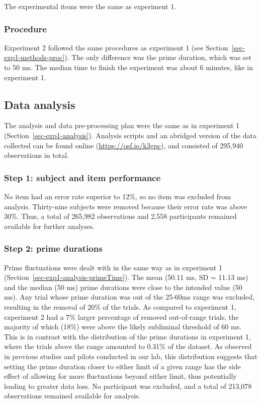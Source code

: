 \documentclass[
]{interact}
\begin{document}
The experimental items were the same as experiment 1.

\subsubsection{Procedure}\label{sec-exp2-methods-proc}

Experiment 2 followed the same procedures as experiment 1 (see
Section~\ref{sec-exp1-methods-proc}). The only difference was the prime
duration, which was set to 50 ms. The median time to finish the
experiment was about 6 minutes, like in experiment 1.

\subsection{Data analysis}\label{sec-exp2-analysis}

The analysis and data pre-processing plan were the same as in experiment
1 (Section~\ref{sec-exp1-analysis}). Analysis scripts and an abridged
version of the data collected can be found online
(\url{https://osf.io/k3gpc}), and consisted of 295,940 observations in
total.

\subsubsection{Step 1: subject and item
performance}\label{sec-exp2-analysis-performance}

No item had an error rate superior to 12\%, so no item was excluded from
analysis. Thirty-nine subjects were removed because their error rate was
above 30\%. Thus, a total of 265,982 observations and 2,558 participants
remained available for further analyses.

\subsubsection{Step 2: prime
durations}\label{sec-exp2-analysis-primeTime}

Prime fluctuations were dealt with in the same way as in experiment 1
(Section~\ref{sec-exp1-analysis-primeTime}). The mean (50.11 ms, SD =
11.13 ms) and the median (50 ms) prime durations were close to the
intended value (50 ms). Any trial whose prime duration was out of the
25-60ms range was excluded, resulting in the removal of 20\% of the
trials. As compared to experiment 1, experiment 2 had a 7\% larger
percentage of removed out-of-range trials, the majority of which (18\%)
were above the likely subliminal threshold of 60 ms. This is in contrast
with the distribution of the prime durations in experiment 1, where the
trials above the range amounted to 0.31\% of the dataset. As observed in
previous studies and pilots conducted in our lab, this distribution
suggests that setting the prime duration closer to either limit of a
given range has the side effect of allowing for more fluctuations beyond
either limit, thus potentially leading to greater data loss. No
participant was excluded, and a total of 213,078 observations remained
available for analysis.
\end{document}
